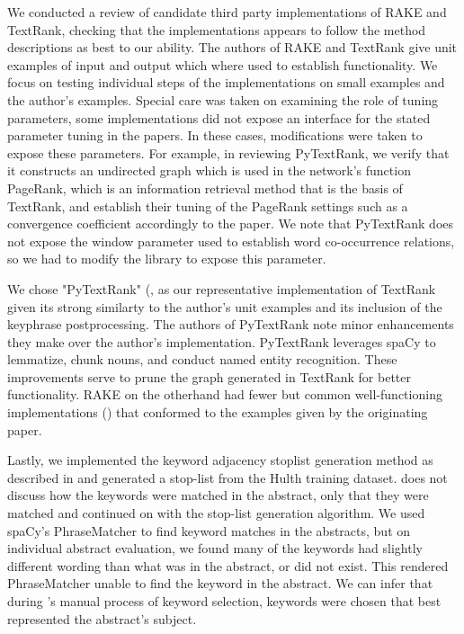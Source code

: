 \documentclass[11pt,a4paper]{article}
\begin{document}
We conducted a review of candidate third party implementations of RAKE and TextRank, checking that the implementations appears to follow the method descriptions as best to our ability. The authors of RAKE and TextRank give unit examples of input and output which where used to establish functionality. We focus on testing individual steps of the implementations on small examples and the author's examples. Special care was taken on examining the role of tuning parameters, some implementations did not expose an interface for the stated parameter tuning in the papers. In these cases, modifications were taken to expose these parameters. For example, in reviewing PyTextRank, we verify that it constructs an undirected graph which is used in the network's function PageRank, which is an information retrieval method that is the basis of TextRank, and establish their tuning of the PageRank settings such as a convergence coefficient accordingly to the paper. We note that PyTextRank does not expose the window parameter used to establish word co-occurrence relations, so we had to modify the library to expose this parameter.

We chose "PyTextRank" (\citet{PyTextRank}, as our representative implementation of TextRank given its strong similarty to the author's unit examples and its inclusion of the keyphrase postprocessing. The authors of PyTextRank note minor enhancements they make over the author's implementation. PyTextRank leverages spaCy to lemmatize, chunk nouns, and conduct named entity recognition. These improvements serve to prune the graph generated in TextRank for better functionality. RAKE on the otherhand had fewer but common well-functioning implementations (\citet{2}) that conformed to the examples given by the originating paper. 

Lastly, we implemented the keyword adjacency stoplist generation method as described in \citet{1} and generated a stop-list from the Hulth training dataset. \citet{1} does not discuss how the keywords were matched in the abstract, only that they were matched and continued on with the stop-list generation algorithm. We used spaCy's PhraseMatcher to find keyword matches in the abstracts, but on individual abstract evaluation, we found many of the keywords had slightly different wording than what was in the abstract, or did not exist. This rendered PhraseMatcher unable to find the keyword in the abstract. We can infer that during \citet{hulth-2003-improved}'s manual process of keyword selection, keywords were chosen that best represented the abstract's subject.
\end{document}

